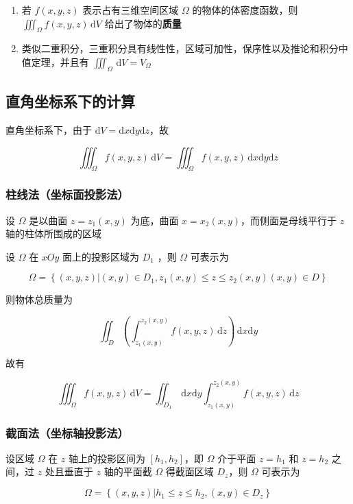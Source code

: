 \documentclass[lang = zh , final , oneside , openany , titlepage , zihao = -4 , linespread = 1.3 , baselineskip = false , cjk-font = windows , text-font = newtx , math-font = newtx , math-style = TeX]{sjtureport}
\begin{document}
\begin{enumerate}
\item
  若 \(f(x,y,z)\) 表示占有三维空间区域 \(\Omega\) 的物体的体密度函数，则 \(\displaystyle\iiint_\Omega f(x,y,z)\,\mathrm{d}V\) 给出了物体的\textbf{质量}
\item
  类似二重积分，三重积分具有线性性，区域可加性，保序性以及推论和积分中值定理，并且有 \(\displaystyle\iiint_\Omega \,\mathrm{d}V = V_\Omega\)
\end{enumerate}

\subsection{直角坐标系下的计算}

直角坐标系下，由于 \(\mathrm{d}V=\mathrm{d}x\mathrm{d}y\mathrm{d}z\)，故

\[\iiint_\Omega f(x,y,z)\,\mathrm{d}V = \iiint_\Omega f(x,y,z)\,\mathrm{d}x\mathrm{d}y\mathrm{d}z\]

\subsubsection{柱线法（坐标面投影法）}

设 \(\Omega\) 是以曲面 \(z=z_1(x,y)\) 为底，曲面
\(x=x_2(x,y)\)，而侧面是母线平行于 \(z\) 轴的柱体所围成的区域

设 \(\Omega\) 在 \(xOy\) 面上的投影区域为 \(D_1\) ，则 \(\Omega\)
可表示为

\[\Omega = \left\{(x,y,z)\bigg| (x,y)\in D_1 , z_1(x,y)\leq z\leq z_2(x,y)(x,y)\in D\right\}\]

则物体总质量为

\[\iint_D\left(\int_{z_1(x,y)}^{z_2(x,y)}f(x,y,z)\,\mathrm{d}z\right) \,\mathrm{d}x\mathrm{d}y\]

故有

\[\iiint_\Omega f(x,y,z)\,\mathrm{d}V = \iint_{D_1} \,\mathrm{d}x\mathrm{d}y\int_{z_1(x,y)}^{z_2(x,y)} f(x,y,z)\,\mathrm{d}z\]

\subsubsection{截面法（坐标轴投影法）}

设区域 \(\Omega\) 在 \(z\) 轴上的投影区间为 \([h_1,h_2]\)，即 \(\Omega\)
介于平面 \(z=h_1\) 和 \(z=h_2\) 之间，过 \(z\) 处且垂直于 \(z\)
轴的平面截 \(\Omega\) 得截面区域 \(D_z\)，则 \(\Omega\) 可表示为

\[\Omega = \left\{(x,y,z)\bigg| h_1\leq z\leq h_2 , (x,y)\in D_z\right\}\]
\end{document}

